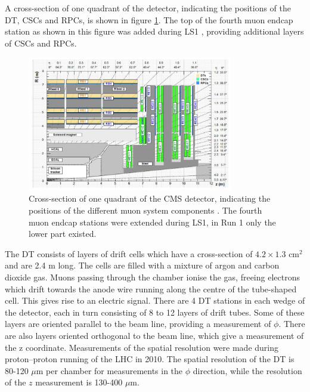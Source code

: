 A cross-section of one quadrant of the detector, indicating
the positions of the \ac{DT}, \ac{CSCs} and \ac{RPCs}, is shown in figure \ref{fig:CMS_MuonSystem}.
The top of the fourth muon endcap station as shown in this figure was added during \ac{LS1} \cite{cms-muon-upgrade}, providing
additional layers of \ac{CSCs} and \ac{RPCs}.
\begin{figure}[h!]
\begin{center}
\includegraphics[width=0.8\textwidth]{./Detector/Plots/MuonSystemUpgrade.png}
\caption[Cross-section of one quadrant of the CMS detector,
indicating the positions of the different muon system components.]{Cross-section of one quadrant of the CMS detector, indicating
the positions of the different muon system components \cite{cms-muon-upgrade}. The 
fourth muon endcap stations were extended during \ac{LS1}, in Run 1 only the lower
part existed.}
\label{fig:CMS_MuonSystem}
\end{center}
\end{figure}
The \ac{DT} consists of layers of drift cells which have a cross-section of $4.2 \times 1.3$ cm$^2$ and
are 2.4 m long. The cells are filled with a mixture of %
argon and carbon dioxide gas.
Muons passing through the chamber ionise the gas, freeing electrons
which drift towards the anode wire running along the centre of the tube-shaped cell. 
This gives rise to an electric signal. There are 4 \ac{DT} stations in each wedge of 
the detector, each in turn consisting of 8 to 12 layers of drift tubes. Some of
these layers are oriented parallel to the beam line, providing a measurement of $\phi$.
There are also layers oriented orthogonal to the beam line, which give a measurement
of the z coordinate. Measurements of the spatial resolution were made
during proton--proton running of the \ac{LHC} in 2010.
The spatial resolution of the \ac{DT} is 80-120 $\mu$m per chamber for
measurements in the $\phi$ direction, while the resolution of the $z$ measurement
is 130-400 $\mu$m\cite{cms-muon-7tev}. %

